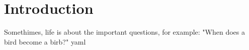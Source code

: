 \section{Introduction}
\label{sec:introduction}

Somethimes, life is about the important questions, for example: "When does a bird become a birb?" \cite{asherelbeinWhenIsaBirdaBirb}
\gls{yaml}
